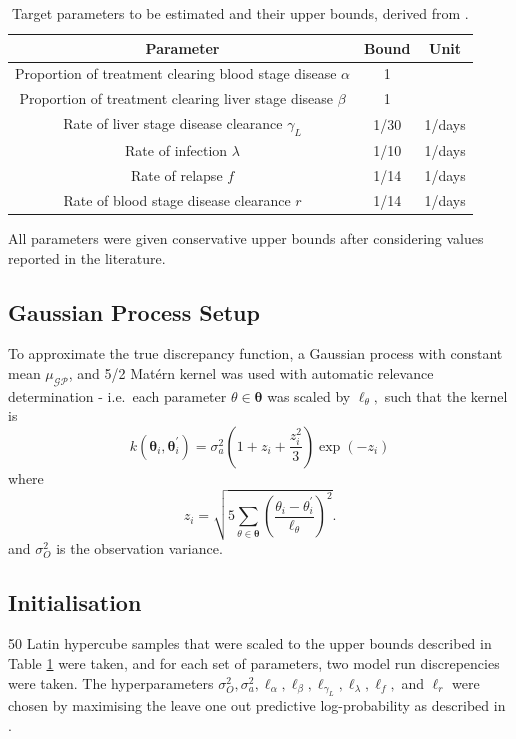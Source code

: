\begin{table}[htbp]
    \centering
    \begin{tabular}{c |c |c}
        Parameter                                                     & Bound & Unit   \\
        \hline
        Proportion of treatment clearing blood stage disease $\alpha$ & 1     &        \\
        Proportion of treatment clearing liver stage disease $\beta$  & 1     &        \\
        Rate of liver stage disease clearance $\gamma_L$              & 1/30  & 1/days \\
        Rate of infection $\lambda$                                   & 1/10  & 1/days \\
        Rate of relapse $f$                                           & 1/14  & 1/days \\
        Rate of blood stage disease clearance $r$                     & 1/14  & 1/days
    \end{tabular}
    \caption{Target parameters to be estimated and their upper bounds, derived from \cite{champagne_using_2022, white_variation_2016}.}
    \label{table:param_bounds}
\end{table}

All parameters were given conservative upper bounds after considering
values reported in the literature.

\subsection*{Gaussian Process Setup}

To approximate the true discrepancy function, a Gaussian process with constant
mean $\mu_{\mathcal{GP}}$, and 5/2 Mat\'ern kernel was used with automatic
relevance determination - i.e.\ each parameter $\theta\in\bm{\theta}$ was 
scaled by $\ell_\theta,$ such
that the kernel is
$$ k(\bm{\theta}_i, \bm{\theta}_i^\prime) = \sigma_a^2 (1 + z_i + \frac{z_i^2}{3})\exp(-z_i)$$
where
$$
    z_i = \sqrt{
        5 \sum_{\theta\in \bm{\theta}}\left(
        \frac{\theta_i - \theta_i^\prime}{\ell_\theta}
        \right)^2
    }.
$$ and $\sigma_O^2$ is the observation variance.

\subsection*{Initialisation}

50 Latin hypercube samples that were scaled to the upper bounds described in
Table \ref{table:param_bounds} were taken, and for each set of parameters, two
model run discrepencies were taken. The hyper\-parameters
$\sigma_O^2, \sigma_a^2, \ell_\alpha, \ell_\beta, \ell_{\gamma_L}, \ell_\lambda, \ell_f,$
and $\ell_r$ were chosen by maximising the leave one out predictive
log-probability as described in \cite[116]{rasmussen_gaussian_2008}.


